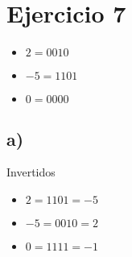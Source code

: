 \section*{Ejercicio 7}

\begin{itemize}
    \item $ 2 = 0010 $
    \item $ -5 = 1101 $
    \item $ 0 = 0000 $
\end{itemize}

\subsection*{a)}

Invertidos

\begin{itemize}
    \item $ 2 = 1101 = -5 $
    \item $ -5 = 0010 = 2 $
    \item $ 0 = 1111 = -1 $
\end{itemize}